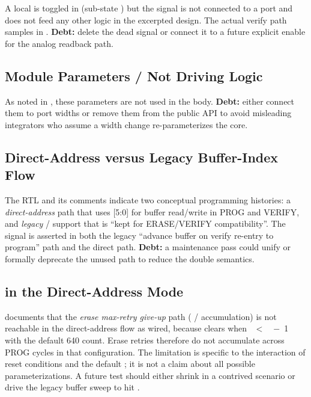 A local  is toggled in 
(sub-state ) but the signal is not connected to a
port and does not feed any other logic in the excerpted design. The
actual verify path samples  in
. \textbf{Debt:} delete the dead signal or connect
it to a future explicit enable for the analog readback path.

\subsection{Module Parameters  /  Not Driving Logic}
\label{sec:lim-params}

As noted in , these parameters are not used
in the  body. \textbf{Debt:} either connect them to
port widths or remove them from the public API to avoid misleading
integrators who assume a width change re-parameterizes the core.

\subsection{Direct-Address versus Legacy Buffer-Index Flow}
\label{sec:lim-dual-flow}

The RTL and its comments indicate two conceptual programming histories:
a \emph{direct-address} path that uses [5:0] for
buffer read/write in PROG and VERIFY, and \emph{legacy}
 /  support that
is ``kept for ERASE/VERIFY compatibility''. The signal
 is asserted in both the legacy
``advance buffer on verify re-entry to program'' path and the direct
 path. \textbf{Debt:} a maintenance pass could unify
or formally deprecate the unused path to reduce the double semantics.

\subsection{ in the Direct-Address Mode}
\label{sec:lim-retry}

 documents that the
\emph{erase max-retry give-up} path (
/  accumulation) is not reachable in the
direct-address flow as wired, because  clears
 when ~\(<\)~~\(-\)~1
with the default 640 count. Erase retries therefore do not accumulate
across PROG cycles in that configuration. The limitation is specific
to the interaction of reset conditions and the default
; it is not a claim about all possible
parameterizations. A future test should either shrink
 in a contrived scenario or drive the
legacy buffer sweep to hit .

